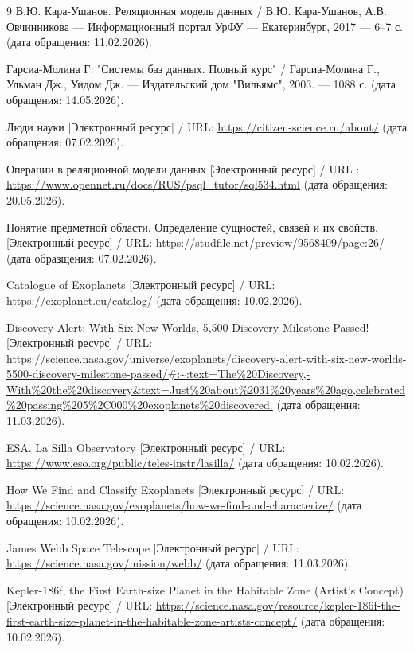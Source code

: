 \documentclass[14pt,a4paper]{extarticle}
\begin{document}
\begin{thebibliography}{9}
		 В.Ю. Кара-Ушанов. Реляционная модель данных / В.Ю. Кара-Ушанов, А.В. Овчинникова --- Информационный портал УрФУ --- Екатеринбург, 2017 --- 6--7 с. (дата обращения: 11.02.2026).

         Гарсиа-Молина Г. "Системы баз данных. Полный курс" / Гарсиа-Молина Г., Ульман Дж., Уидом Дж. --- Издательский дом "Вильямс",  2003. --- 1088 с. (дата обращения: 14.05.2026).
		
		 Люди науки [Электронный ресурс] / URL: \url{https://citizen-science.ru/about/} (дата обращения: 07.02.2026).
		
         Операции в реляционной модели данных [Электронный ресурс] / URL : \url{https://www.opennet.ru/docs/RUS/psql_tutor/sql534.html} (дата обращения: 20.05.2026).
		
		 Понятие предметной области. Определение сущностей, связей и их свойств. [Электронный ресурс] / URL: \url{https://studfile.net/preview/9568409/page:26/} (дата образщения: 07.02.2026).
		
		 Catalogue of Exoplanets [Электронный ресурс] / URL: \url{https://exoplanet.eu/catalog/} (дата обращения: 10.02.2026).
		
		 Discovery Alert: With Six New Worlds, 5,500 Discovery Milestone Passed! [Электронный ресурс] / URL: \url{https://science.nasa.gov/universe/exoplanets/discovery-alert-with-six-new-worlds-5500-discovery-milestone-passed/#:~:text=The%20Discovery,-With%20the%20discovery&text=Just%20about%2031%20years%20ago,celebrated%20passing%205%2C000%20exoplanets%20discovered.} (дата обращения: 11.03.2026).
		
		 ESA. La Silla Observatory [Электронный ресурс] / URL: \url{https://www.eso.org/public/teles-instr/lasilla/} (дата обращения: 10.02.2026).
		
		 How We Find and Classify Exoplanets [Электронный ресурс] / URL: \url{https://science.nasa.gov/exoplanets/how-we-find-and-characterize/} (дата обращения: 10.02.2026).
		
		 James Webb Space Telescope [Электронный ресурс] / URL: \url{https://science.nasa.gov/mission/webb/} (дата обращения: 11.03.2026).
		
		 Kepler-186f, the First Earth-size Planet in the Habitable Zone (Artist’s Concept) [Электронный ресурс] / URL: \url{https://science.nasa.gov/resource/kepler-186f-the-first-earth-size-planet-in-the-habitable-zone-artists-concept/} (дата обращения: 10.02.2026).
		

\end{thebibliography}
\end{document}
